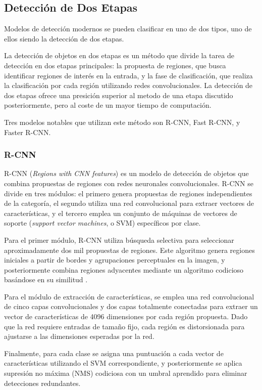 \subsection{Detección de Dos Etapas}
Modelos de detección modernos se pueden clasificar en uno de dos tipos, uno de ellos siendo
la detección de dos etapas.
\medskip

La detección de objetos en dos etapas es un método
que divide la tarea de detección en dos etapas principales: la propuesta de regiones,
que busca identificar regiones de interés en la entrada, y la fase de clasificación,
que realiza la clasificación por cada región utilizando redes convolucionales. La detección de dos
etapas ofrece una presición superior al metodo de una etapa discutido posteriormente, pero al coste de
un mayor tiempo de computación. 
\medskip

Tres modelos notables que utilizan este método son R-CNN, Fast R-CNN, y Faster R-CNN.

\subsubsection{R-CNN}
R-CNN (\textit{Regions with CNN features}) es un modelo de detección de objetos que combina 
propuestas de regiones con redes neuronales convolucionales. R-CNN se divide en tres módulos: 
el primero genera propuestas de regiones independientes de la categoría, el segundo utiliza una 
red convolucional para extraer vectores de características, y el tercero emplea un conjunto de 
máquinas de vectores de soporte (\textit{support vector machines}, o SVM) específicos por clase.
\medskip

Para el primer módulo, R-CNN utiliza búsqueda selectiva para seleccionar aproximadamente dos mil 
propuestas de regiones. Este algoritmo genera regiones iniciales 
a partir de bordes y agrupaciones perceptuales en la imagen, y posteriormente combina regiones 
adyacentes mediante un algoritmo codicioso basándose en su similitud \parencite{uijlings2013selective}.
\medskip

Para el módulo de extracción de características, se emplea una red convolucional de cinco capas 
convolucionales y dos capas totalmente conectadas para extraer un vector de características de 
4096 dimensiones por cada región propuesta. Dado que la red requiere entradas de tamaño fijo, 
cada región es distorsionada para ajustarse a las dimensiones esperadas por la red.
\medskip

Finalmente, para cada clase se asigna una puntuación a cada vector de características utilizando 
el SVM correspondiente, y posteriormente se aplica supresión no máxima (NMS) codiciosa con un umbral 
aprendido para eliminar detecciones redundantes.
\medskip


